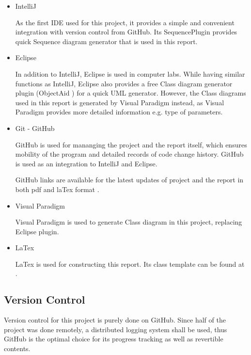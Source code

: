 \begin{itemize}
	\item{IntelliJ} \cite{intellij}
	
	As the first IDE used for this project, it provides a simple and convenient integration with version control from GitHub. Its SequencePlugin \cite{sequenceplugin} provides quick Sequence diagram generator that is used in this report. 
	
	\item{Eclipse} \cite{eclipse}
	
	In addition to IntelliJ, Eclipse is used in computer labs. While having similar functions as IntelliJ, Eclipse also provides a free Class diagram generator plugin (ObjectAid \cite{objectaid}) for a quick UML generator. However, the Class diagrams used in this report is generated by Visual Paradigm instead, as Visual Paradigm provides more detailed information e.g. type of parameters. 
		
	\item{Git - GitHub} \cite{github}
	
	GitHub is used for mananging the project and the report itself, which ensures mobility of the program and detailed records of code change history. GitHub is used as an integration to IntelliJ and Eclipse.
	
	GitHub links are available for the latest updates of project \cite{githubproject} and the report in both pdf and laTex format \cite{githubreport}.
	
	\item{Visual Paradigm} \cite{visualparadigm}
	
	Visual Paradigm is used to generate Class diagram in this project, replacing Eclipse plugin.
		
	\item{LaTex}
	
	LaTex is used for constructing this report. Its class template can be found at \cite{sphdtemplate}.

\end{itemize}

\subsection{Version Control}
	Version control for this project is purely done on GitHub. Since half of the project was done remotely, a distributed logging system shall be used, thus GitHub is the optimal choice for its progress tracking as well as revertible contents.
	





